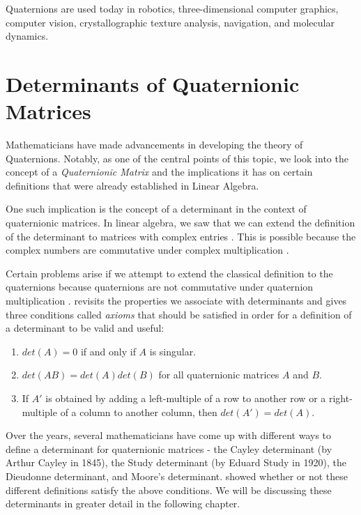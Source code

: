 Quaternions are used today in robotics, three-dimensional computer graphics, computer vision, crystallographic texture analysis, navigation, and molecular dynamics. 

\section{Determinants of Quaternionic Matrices}

Mathematicians have made advancements in developing the theory of Quaternions. Notably, as one of the central points of this topic, we look into the concept of a \emph{Quaternionic Matrix} and the implications it has on certain definitions that were already established in Linear Algebra. 

One such implication is the concept of a determinant in the context of quaternionic matrices. In linear algebra, we saw that we can extend the definition of the determinant to matrices with complex entries \cite{stamaria}. This is possible because the complex numbers are commutative under complex multiplication \cite{aslaksen}. 

Certain problems arise if we attempt to extend the classical definition to the quaternions because quaternions are not commutative under quaternion multiplication \cite{aslaksen}. \cite{aslaksen} revisits the properties we associate with determinants and gives three conditions called \emph{axioms} that should be satisfied in order for a definition of a determinant to be valid and useful:
\begin{enumerate}
	\item $det(A) = 0$ if and only if $A$ is singular.
	\item $det(AB) = det(A)det(B)$ for all quaternionic matrices $A$ and $B$.
	\item If $A'$ is obtained by adding a left-multiple of a row to another row or a right-multiple of a column to another column, then $det(A')=det(A)$.
\end{enumerate}

Over the years, several mathematicians have come up with different ways to define a determinant for quaternionic matrices - the Cayley determinant (by Arthur Cayley in 1845), the Study determinant (by Eduard Study in 1920), the Dieudonne determinant, and Moore's determinant. \cite{aslaksen} showed whether or not these different definitions satisfy the above conditions. We will be discussing these determinants in greater detail in the following chapter.

